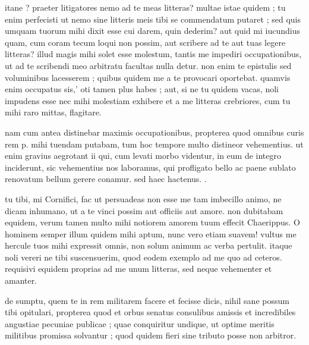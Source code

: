 


 itane ? praeter litigatores nemo ad te meas litteras? multae istae quidem ; tu enim perfecisti ut nemo sine litteris meis tibi se commendatum putaret ; sed quis umquam tuorum mihi dixit esse cui darem, quin dederim? aut quid mi iucundius quam, cum coram tecum loqui non possim, aut scribere ad te aut tuas legere litteras? illud magis mihi solet esse molestum, tantis me impediri occupationibus, ut ad te scribendi meo arbitratu facultas nulla detur. non enim te epistulis sed voluminibus lacesserem ; quibus quidem me a te provocari oportebat. quamvis enim occupatus sis,' oti tamen plus habes ; aut, si ne tu quidem vacas, noli impudens esse nec mihi molestiam exhibere et a me litteras crebriores, cum tu mihi raro mittas, flagitare.

 nam cum antea distinebar maximis occupationibus, propterea quod omnibus curis rem p. mihi tuendam putabam, tum hoc tempore multo distineor vehementius. ut enim gravius aegrotant ii qui, cum levati morbo videntur, in eum de integro inciderunt, sic vehementius nos laboramus, qui profligato bello ac paene sublato renovatum bellum gerere conamur. sed haec hactenus. .

 tu tibi, mi Cornifici, fac ut persuadeas non esse me tam imbecillo animo, ne dicam inhumano, ut a te vinci possim aut officiis aut amore. non dubitabam equidem, verum tamen multo mihi notiorem amorem tuum effecit Chaerippus. O hominem semper illum quidem mihi aptum, nunc vero etiam suavem! vultus me hercule tuos mihi expressit omnis, non solum animum ac verba pertulit. itaque noli vereri ne tibi suscensuerim, quod eodem exemplo ad me quo ad ceteros. requisivi equidem proprias ad me unum litteras, sed neque vehementer et amanter.

 de sumptu, quem te in rem militarem facere et fecisse dicis, nihil sane possum tibi opitulari, propterea quod et orbus senatus consulibus amissis et incredibiles angustiae pecuniae publicae ; quae conquiritur undique, ut optime meritis militibus promissa solvantur ; quod quidem fieri sine tributo posse non arbitror.

